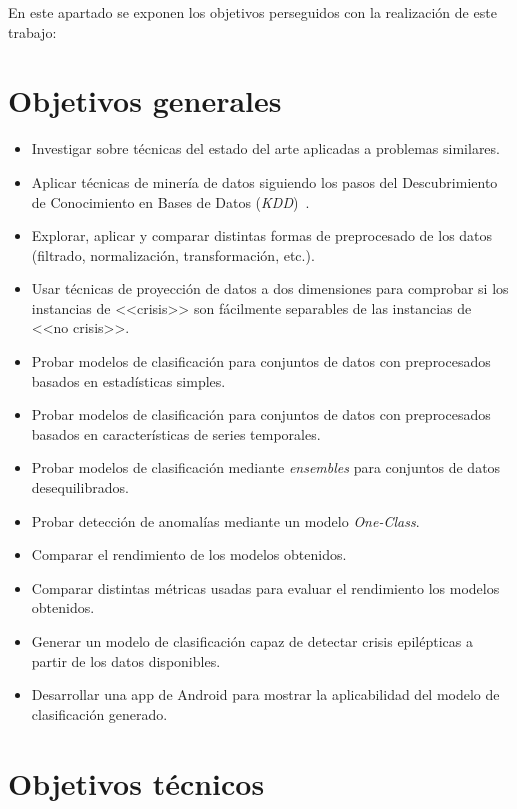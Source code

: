 
En este apartado se exponen los objetivos perseguidos con la realización de este trabajo: 

\section{Objetivos generales}

\begin{itemize}
	\item Investigar sobre técnicas del estado del arte aplicadas a problemas similares. 
	\item Aplicar técnicas de minería de datos siguiendo los pasos del Descubrimiento de Conocimiento en Bases de Datos (\textit{KDD})~\cite{fayyad1996data}.
	\item Explorar, aplicar y comparar distintas formas de preprocesado de los datos (filtrado, normalización, transformación, etc.). 
	\item Usar técnicas de proyección de datos a dos dimensiones para comprobar si los instancias de <<crisis>> son fácilmente separables de las instancias de <<no crisis>>. 
	\item Probar modelos de clasificación para conjuntos de datos con preprocesados basados en estadísticas simples.
	\item Probar modelos de clasificación para conjuntos de datos con preprocesados basados en características de series temporales.  
	\item Probar modelos de clasificación mediante \textit{ensembles} para conjuntos de datos desequilibrados. 
	\item Probar detección de anomalías mediante un modelo \textit{One-Class}.
	\item Comparar el rendimiento de los modelos obtenidos. 
	\item Comparar distintas métricas usadas para evaluar el rendimiento los modelos obtenidos. 
	\item Generar un modelo de clasificación capaz de detectar crisis epilépticas a partir de los datos disponibles. 
	\item Desarrollar una app de Android para mostrar la aplicabilidad del modelo de clasificación generado. 
\end{itemize}

\section{Objetivos técnicos}


